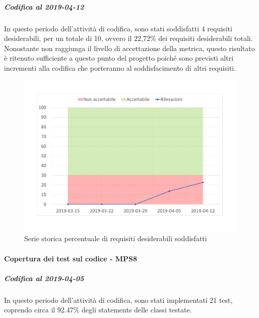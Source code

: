 \subparagraph{Codifica al 2019-04-12}
In questo periodo dell'attività di codifica, sono stati soddisfatti 4 requisiti desiderabili, per un totale di 10, ovvero il 22,72\% dei requisiti desiderabili totali.
Nonostante non raggiunga il livello di accettazione della
metrica, questo risultato è ritenuto sufficiente a questo punto del progetto poiché sono previsti altri incrementi alla codifica che porteranno al soddisfacimento di altri requisiti.
\begin{figure}[H]
	\centering
	\includegraphics[scale=0.6]{images/resoconto/MPS7Chart.pdf}
	\caption{Serie storica percentuale di requisiti desiderabili soddisfatti}	
\end{figure}

\paragraph{Copertura dei test sul codice - MPS8}
\subparagraph{Codifica al 2019-04-05}
In questo periodo dell'attività di codifica, sono stati implementati 21 test, coprendo circa il 92.47\% degli statements delle classi testate.

